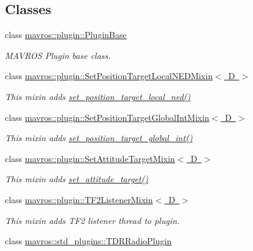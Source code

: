 \subsection*{Classes}
\begin{DoxyCompactItemize}
\item 
class \mbox{\hyperlink{classmavros_1_1plugin_1_1PluginBase}{mavros\+::plugin\+::\+Plugin\+Base}}
\begin{DoxyCompactList}\small\item\em M\+A\+V\+R\+OS Plugin base class. \end{DoxyCompactList}\item 
class \mbox{\hyperlink{classmavros_1_1plugin_1_1SetPositionTargetLocalNEDMixin}{mavros\+::plugin\+::\+Set\+Position\+Target\+Local\+N\+E\+D\+Mixin$<$ D $>$}}
\begin{DoxyCompactList}\small\item\em This mixin adds \mbox{\hyperlink{group__plugin_ga9144d4820f4e4d8146c977ba81a59579}{set\+\_\+position\+\_\+target\+\_\+local\+\_\+ned()}} \end{DoxyCompactList}\item 
class \mbox{\hyperlink{classmavros_1_1plugin_1_1SetPositionTargetGlobalIntMixin}{mavros\+::plugin\+::\+Set\+Position\+Target\+Global\+Int\+Mixin$<$ D $>$}}
\begin{DoxyCompactList}\small\item\em This mixin adds \mbox{\hyperlink{group__plugin_ga6e107096694f2c4483c9578a1a93d085}{set\+\_\+position\+\_\+target\+\_\+global\+\_\+int()}} \end{DoxyCompactList}\item 
class \mbox{\hyperlink{classmavros_1_1plugin_1_1SetAttitudeTargetMixin}{mavros\+::plugin\+::\+Set\+Attitude\+Target\+Mixin$<$ D $>$}}
\begin{DoxyCompactList}\small\item\em This mixin adds \mbox{\hyperlink{group__plugin_gac84714c4a377cd9eeef8ead08b0e8bc5}{set\+\_\+attitude\+\_\+target()}} \end{DoxyCompactList}\item 
class \mbox{\hyperlink{classmavros_1_1plugin_1_1TF2ListenerMixin}{mavros\+::plugin\+::\+T\+F2\+Listener\+Mixin$<$ D $>$}}
\begin{DoxyCompactList}\small\item\em This mixin adds T\+F2 listener thread to plugin. \end{DoxyCompactList}\item 
class \mbox{\hyperlink{classmavros_1_1std__plugins_1_1TDRRadioPlugin}{mavros\+::std\+\_\+plugins\+::\+T\+D\+R\+Radio\+Plugin}}

\end{DoxyCompactItemize}
